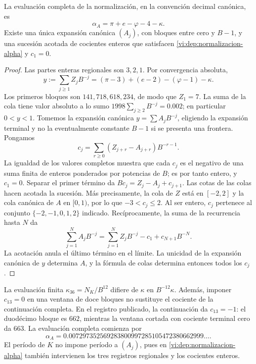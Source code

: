 \begin{theorem}
\label{vi:dep:alpha-completa}
La evaluación completa de la normalización, en la convención decimal
canónica, es
\begin{equation}
 \alpha_A=\pi+e-\varphi-4-\kappa.
 \label{vi:dep:alpha-A}
\end{equation}
Existe una única expansión canónica \((A_j)\), con bloques entre cero
y \(B-1\), y una sucesión acotada de cocientes enteros que satisfacen
\eqref{vi:dep:normalizacion-alpha} y \(c_1=0\).
\end{theorem}
\begin{proof}
Las partes enteras regionales son \(3,2,1\). Por convergencia absoluta,
\[
 y:=\sum_{j\ge1}Z_jB^{-j}
   =(\pi-3)+(e-2)-(\varphi-1)-\kappa.
\]
Los primeros bloques son \(141,718,618,234\), de modo que
\(Z_1=7\). La suma de la cola tiene valor absoluto a lo sumo
\(1998\sum_{j\ge2}B^{-j}=0.002\); en particular \(0<y<1\).
Tomemos la expansión canónica \(y=\sum A_jB^{-j}\), eligiendo la
expansión terminal y no la eventualmente constante \(B-1\) si se
presenta una frontera. Pongamos
\[
 c_j=\sum_{r\ge0}(Z_{j+r}-A_{j+r})B^{-r-1}.
\]
La igualdad de los valores completos muestra que cada \(c_j\) es el
negativo de una suma finita de enteros ponderados por potencias de
\(B\); es por tanto entero, y \(c_1=0\). Separar el primer término
da \(Bc_j=Z_j-A_j+c_{j+1}\). Las cotas de las colas hacen acotada
la sucesión. Más precisamente, la cola de \(Z\) está en \([-2,2]\)
y la cola canónica de \(A\) en \([0,1)\), por lo que
\(-3<c_j\le2\). Al ser entero, \(c_j\) pertenece al conjunto
\(\{-2,-1,0,1,2\}\) indicado.
Recíprocamente, la suma de la recurrencia hasta \(N\) da
\[
 \sum_{j=1}^N A_jB^{-j}
 =\sum_{j=1}^N Z_jB^{-j}-c_1+c_{N+1}B^{-N}.
\]
La acotación anula el último término en el límite. La unicidad de la
expansión canónica de \(y\) determina \(A\), y la fórmula de colas
determina entonces todos los \(c_j\).
\end{proof}

La evaluación finita \(\kappa_{36}=N_K/B^{12}\) difiere de
\(\kappa\) en \(B^{-12}\kappa\). Además, imponer
\(c_{13}=0\) en una ventana de doce bloques no sustituye el cociente
de la continuación completa. En el registro publicado, la continuación
da \(c_{13}=-1\): el duodécimo bloque es \(662\), mientras la
ventana cortada con cociente terminal cero da \(663\). La evaluación
completa comienza por
\[
 \alpha_A=0.007297352569283800997285105472380662999\ldots.
\]
El período de \(K\) no impone período a \((A_j)\), pues en
\eqref{vi:dep:normalizacion-alpha} también intervienen los tres
registros regionales y los cocientes enteros.

